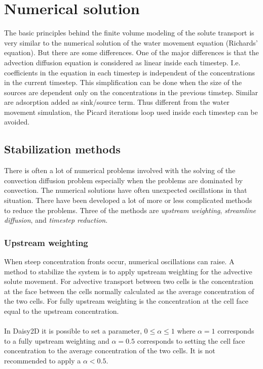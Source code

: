 \documentclass{report}
\begin{document}
\section{Numerical solution}

The basic principles behind the finite volume modeling of the solute
transport is very similar to the numerical solution of the water
movement equation (Richards' equation). But there are some
differences. One of the major differences is that the advection
diffusion equation is considered as linear inside each timestep.
I.e. coefficients in the equation in each timestep is independent of
the concentrations in the current timestep. This simplification can
be done when the size of the sources are dependent only on the
concentrations in the previous timstep. Similar are adsorption added
as sink/source term. Thus different from the water movement
simulation, the Picard iterations loop used inside each timestep can
be avoided.



\subsection{Stabilization methods}

There is often a lot of numerical problems involved with the solving
of the convection diffusion problem especially when the problems
are dominated by convection. The numerical solutions have often
unexpected oscillations in that situation. There have been developed
a lot of more or less complicated methods to reduce the problems.
Three of the methods are \textit{upstream weighting},
\textit{streamline diffusion}, and \textit{timestep reduction}.



\subsubsection{Upstream weighting}

When steep concentration fronts occur, numerical oscillations can
raise. A method to stabilize the system is to apply upstream
weighting for the advective solute movement. For advective
transport between two cells is the concentration at the face
between the cells normally calculated as the average concentration
of the two cells. For fully upstream weighting is the concentration at
the cell face equal to the upstream concentration. \\
\\
In Daisy2D it is possible to set a parameter,  $0\leq \alpha \leq 1$
where $\alpha=1$ corresponds to a fully upstream weighting and
$\alpha=0.5$ corresponds to setting the cell face concentration to
the average concentration of the two cells. It is not recommended
to apply a $\alpha<0.5$.
\end{document}
